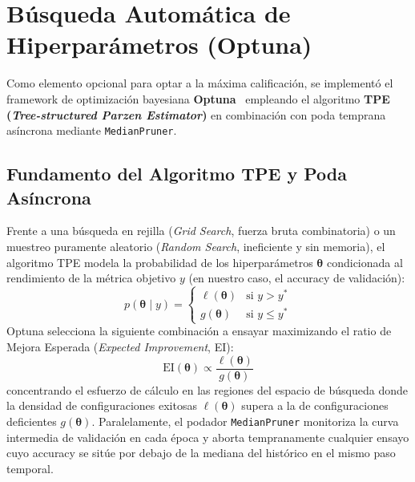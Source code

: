 \documentclass[11pt,a4paper]{article}
\begin{document}
\section{Búsqueda Automática de Hiperparámetros (Optuna)}

Como elemento opcional para optar a la máxima calificación, se implementó el framework de optimización bayesiana \textbf{Optuna}~\cite{akiba2019optuna} empleando el algoritmo \textbf{TPE (\textit{Tree-structured Parzen Estimator})} en combinación con poda temprana asíncrona mediante \texttt{MedianPruner}.

\subsection{Fundamento del Algoritmo TPE y Poda Asíncrona}
Frente a una búsqueda en rejilla (\textit{Grid Search}, fuerza bruta combinatoria) o un muestreo puramente aleatorio (\textit{Random Search}, ineficiente y sin memoria), el algoritmo TPE modela la probabilidad de los hiperparámetros $\boldsymbol{\theta}$ condicionada al rendimiento de la métrica objetivo $y$ (en nuestro caso, el accuracy de validación):
\begin{equation}
    p(\boldsymbol{\theta} \mid y) = 
    \begin{cases} 
        \ell(\boldsymbol{\theta}) & \text{si } y > y^* \\ 
        g(\boldsymbol{\theta}) & \text{si } y \le y^* 
    \end{cases}
\end{equation}
Optuna selecciona la siguiente combinación a ensayar maximizando el ratio de Mejora Esperada (\textit{Expected Improvement}, EI):
\begin{equation}
    \text{EI}(\boldsymbol{\theta}) \propto \frac{\ell(\boldsymbol{\theta})}{g(\boldsymbol{\theta})}
\end{equation}
concentrando el esfuerzo de cálculo en las regiones del espacio de búsqueda donde la densidad de configuraciones exitosas $\ell(\boldsymbol{\theta})$ supera a la de configuraciones deficientes $g(\boldsymbol{\theta})$. Paralelamente, el podador \texttt{MedianPruner} monitoriza la curva intermedia de validación en cada época y aborta tempranamente cualquier ensayo cuyo accuracy se sitúe por debajo de la mediana del histórico en el mismo paso temporal.
\end{document}
